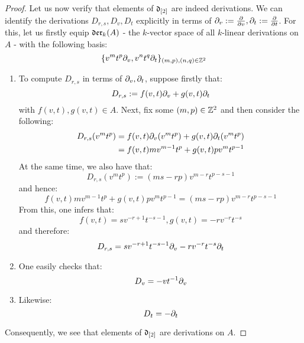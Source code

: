 \begin{proof}
                Let us now verify that elements of $\mathfrak{d}_{[2]}$ are indeed derivations. We can identify the derivations $D_{r, s}, D_v, D_t$ explicitly in terms of $\partial_v := \frac{\partial}{\partial v}, \partial_t := \frac{\partial}{\partial t}$. For this, let us firstly equip $\mathfrak{der}_{k}(A)$ - the $k$-vector space of all $k$-linear derivations on $A$ - with the following basis:
                    $$\{ v^m t^p \partial_v, v^n t^q \partial_t \}_{(m, p), (n, q) \in \mathbb{Z}^2}$$
                \begin{enumerate}
                    \item To compute $D_{r, s}$ in terms of $\partial_v, \partial_t$, suppose firstly that:
                        $$D_{r, s} := f(v, t) \partial_v + g(v, t) \partial_t$$
                    with $f(v, t), g(v, t) \in A$. Next, fix some $(m, p) \in \mathbb{Z}^2$ and then consider the following:
                        $$
                            \begin{aligned}
                                D_{r, s}( v^m t^p ) & = f(v, t) \partial_v( v^m t^p ) + g(v, t) \partial_t( v^m t^p )
                                \\
                                & = f(v, t) m v^{m - 1} t^p + g(v, t) p v^m t^{p - 1}
                            \end{aligned}
                        $$
                    At the same time, we also have that:
                        $$D_{r, s}(v^m t^p) := ( ms - rp ) v^{m - r} t^{p - s - 1}$$
                    and hence:
                        $$f(v, t) m v^{m - 1} t^p + g(v, t) p v^m t^{p - 1} = ( ms - rp ) v^{m - r} t^{p - s - 1}$$
                    From this, one infers that:
                        $$f(v, t) = s v^{-r + 1} t^{-s - 1}, g(v, t) = -r v^{-r} t^{-s}$$
                    and therefore:
                        $$D_{r, s} = s v^{-r + 1} t^{-s - 1} \partial_v - r v^{-r} t^{-s} \partial_t$$
                    \item One easily checks that:
                        $$D_v = -v t^{-1} \partial_v$$
                    \item Likewise:
                        $$D_t = -\partial_t$$
                \end{enumerate}
                Consequently, we see that elements of $\mathfrak{d}_{[2]}$ are derivations on $A$.
            \end{proof}
